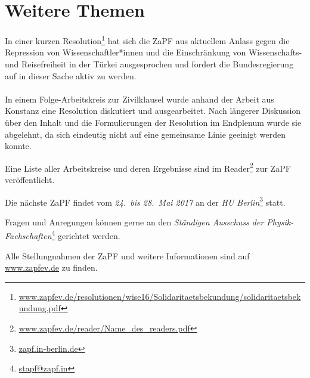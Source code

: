 \section*{Weitere Themen}
In einer kurzen Resolution\footnote{\href{https://zapfev.de/resolutionen/wise16/Solidaritaetsbekundung/solidaritaetsbekundung.pdf}{\url{www.zapfev.de/resolutionen/wise16/Solidaritaetsbekundung/solidaritaetsbekundung.pdf}}} 
hat sich die ZaPF aus aktuellem Anlass gegen die Repression von Wissenschaftler*innen und die Einschränkung von Wissenschafts- und Reisefreiheit in der Türkei ausgesprochen 
und fordert die Bundesregierung auf in dieser Sache aktiv zu werden.\\ \\
In einem Folge-Arbeitskreis zur Zivilklausel wurde anhand der Arbeit aus Konstanz eine Resolution diskutiert und ausgearbeitet. Nach längerer Diskussion über den 
Inhalt und die Formulierungen der Resolution im Endplenum wurde sie abgelehnt, da sich eindeutig nicht auf eine gemeinsame Linie geeinigt werden konnte.
				
		
Eine Liste aller Arbeitskreise und deren Ergebnisse sind im
Reader\footnote{\href{http://www.zapfev.de/reader/Name_des_readers.pdf}{\url{www.zapfev.de/reader/Name_des_readers.pdf}}}
zur ZaPF veröffentlicht.
		
\vfill
		
Die nächste ZaPF findet vom \emph{24.\ bis 28.\ Mai 2017} an der  \emph{HU Berlin}\footnote{\href{zapf.in-berlin.de}{\url{zapf.in-berlin.de}}} statt.
		
Fragen und Anregungen können gerne an den \emph{Ständigen Ausschuss der Physik-Fachschaften}\footnote{\href{mailto:stapf@zapf.in}{\url{stapf@zapf.in}}} gerichtet werden.
		
Alle Stellungnahmen der ZaPF und weitere Informationen sind auf \href{http://www.zapfev.de}{\url{www.zapfev.de}} zu finden.
		
		
		
		
